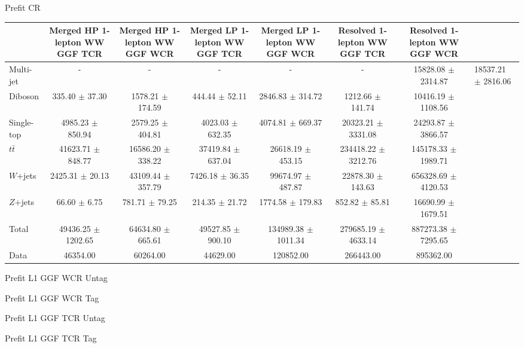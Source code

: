 




 Prefit CR 
\begin{tabular}{|l|c|c|c|c|c|c|}
\hline
	  &	Merged HP 1-lepton WW GGF TCR &	Merged HP 1-lepton WW GGF WCR &	Merged LP 1-lepton WW GGF TCR &	Merged LP 1-lepton WW GGF WCR &	Resolved 1-lepton WW GGF TCR &	Resolved 1-lepton WW GGF WCR \\\hline 
	Multi-jet &	- &	- &	- &	- &	- &	15828.08 $\pm$ 2314.87 &	18537.21 $\pm$ 2816.06 \\\hline 
	Diboson &	335.40 $\pm$ 37.30 &	1578.21 $\pm$ 174.59 &	444.44 $\pm$ 52.11 &	2846.83 $\pm$ 314.72 &	1212.66 $\pm$ 141.74 &	10416.19 $\pm$ 1108.56 \\\hline 
	Single-top &	4985.23 $\pm$ 850.94 &	2579.25 $\pm$ 404.81 &	4023.03 $\pm$ 632.35 &	4074.81 $\pm$ 669.37 &	20323.21 $\pm$ 3331.08 &	24293.87 $\pm$ 3866.57 \\\hline 
	$t\bar{t}$ &	41623.71 $\pm$ 848.77 &	16586.20 $\pm$ 338.22 &	37419.84 $\pm$ 637.04 &	26618.19 $\pm$ 453.15 &	234418.22 $\pm$ 3212.76 &	145178.33 $\pm$ 1989.71 \\\hline 
	$W$+jets &	2425.31 $\pm$ 20.13 &	43109.44 $\pm$ 357.79 &	7426.18 $\pm$ 36.35 &	99674.97 $\pm$ 487.87 &	22878.30 $\pm$ 143.63 &	656328.69 $\pm$ 4120.53 \\\hline 
	$Z$+jets &	66.60 $\pm$ 6.75 &	781.71 $\pm$ 79.25 &	214.35 $\pm$ 21.72 &	1774.58 $\pm$ 179.83 &	852.82 $\pm$ 85.81 &	16690.99 $\pm$ 1679.51 \\\hline 
	Total &	49436.25 $\pm$ 1202.65 &	64634.80 $\pm$ 665.61 &	49527.85 $\pm$ 900.10 &	134989.38 $\pm$ 1011.34 &	279685.19 $\pm$ 4633.14 &	887273.38 $\pm$ 7295.65 \\\hline 
	Data &	46354.00 &	60264.00 &	44629.00 &	120852.00 &	266443.00 &	895362.00 \\\hline 
\end{tabular}

 Prefit L1 GGF WCR Untag 

 Prefit L1 GGF WCR Tag 

 Prefit L1 GGF TCR Untag 

 Prefit L1 GGF TCR Tag 
